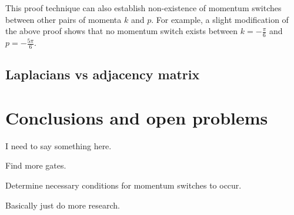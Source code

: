 \documentclass[../thesis-main/thesis-main]{subfiles}
\begin{document}
This proof technique can also establish non-existence of momentum switches between other pairs of momenta $k$ and $p$.  For example, a slight modification of the above proof shows that no momentum switch exists between $k = -\frac{\pi}{6}$ and $p = -\frac{5\pi}{6}$. 

\subsection{Laplacians vs adjacency matrix}




\section{Conclusions and open problems}

I need to say something here.

Find more gates.

Determine necessary conditions for momentum switches to occur.

Basically just do more research.
\end{document}
